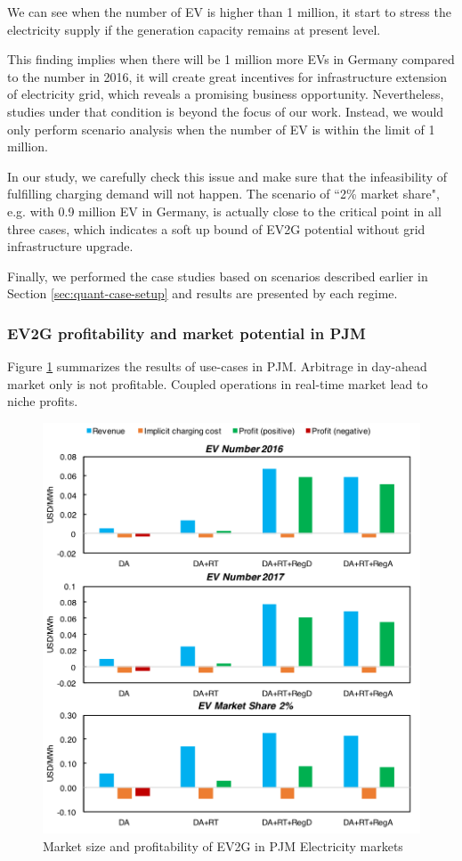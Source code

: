 We can see when the number of EV is higher than 1 million, it start to stress the electricity supply if the generation capacity remains at present level. 

This finding implies when there will be 1 million more EVs in Germany compared to the number in 2016, it will create great incentives for infrastructure extension of electricity grid, which reveals a promising business opportunity. Nevertheless, studies under that condition is beyond the focus of our work. Instead, we would only perform scenario analysis when the number of EV is within the limit of 1 million. 

In our study, we carefully check this issue and make sure that the infeasibility of fulfilling charging demand will not happen. The scenario of ``2\% market share", e.g. with 0.9 million EV in Germany, is actually close to the critical point in all three cases, which indicates a soft up bound of EV2G potential without grid infrastructure upgrade. 

Finally, we performed the case studies based on scenarios described earlier in Section \ref{sec:quant-case-setup} and results are presented by each regime.

\subsubsection{EV2G profitability and market potential in PJM}

Figure \ref{fig:PJM_EV} summarizes the results of use-cases in PJM. Arbitrage in day-ahead market only is not profitable. Coupled operations in real-time market lead to niche profits. 

\begin{figure}[h!]
	\centering
	\includegraphics[width=0.9\linewidth]{Figures/PJM_EV_profit}
	\caption{Market size and profitability of EV2G in PJM Electricity markets}
	\label{fig:PJM_EV}
\end{figure}

